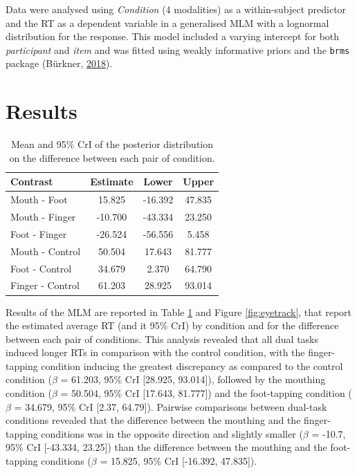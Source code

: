 \documentclass[a4paper,12pt,twoside,openright,oldfontcommands,final]{memoir}
\begin{document}
Data were analysed using \emph{Condition} (4 modalities) as a within-subject predictor and the RT as a dependent variable in a generalised MLM with a lognormal distribution for the response. This model included a varying intercept for both \emph{participant} and \emph{item} and was fitted using weakly informative priors and the \texttt{brms} package (Bürkner, \protect\hyperlink{ref-R-brms}{2018}).

\hypertarget{results-5}{%
\section{Results}\label{results-5}}

\begin{table}[H]
\begin{center}
\begin{threeparttable}
\caption{\label{tab:RTestimates}Mean and 95\% CrI of the posterior distribution on the difference between each pair of condition.}
\small{
\begin{tabular}{lccc}
\toprule
Contrast & \multicolumn{1}{c}{Estimate} & \multicolumn{1}{c}{Lower} & \multicolumn{1}{c}{Upper}\\
\midrule
Mouth - Foot & 15.825 & -16.392 & 47.835\\
Mouth - Finger & -10.700 & -43.334 & 23.250\\
Foot - Finger & -26.524 & -56.556 & 5.458\\
Mouth - Control & 50.504 & 17.643 & 81.777\\
Foot - Control & 34.679 & 2.370 & 64.790\\
Finger - Control & 61.203 & 28.925 & 93.014\\
\bottomrule
\end{tabular}
}
\end{threeparttable}
\end{center}
\end{table}

Results of the MLM are reported in Table \ref{tab:RTestimates} and Figure \ref{fig:eyetrack}, that report the estimated average RT (and it 95\% CrI) by condition and for the difference between each pair of conditions. This analysis revealed that all dual tasks induced longer RTs in comparison with the control condition, with the finger-tapping condition inducing the greatest discrepancy as compared to the control condition (\(\beta\) = 61.203, 95\% CrI {[}28.925, 93.014{]}), followed by the mouthing condition (\(\beta\) = 50.504, 95\% CrI {[}17.643, 81.777{]}) and the foot-tapping condition (\(\beta\) = 34.679, 95\% CrI {[}2.37, 64.79{]}). Pairwise comparisons between dual-task conditions revealed that the difference between the mouthing and the finger-tapping conditions was in the opposite direction and slightly smaller (\(\beta\) = -10.7, 95\% CrI {[}-43.334, 23.25{]}) than the difference between the mouthing and the foot-tapping conditions (\(\beta\) = 15.825, 95\% CrI {[}-16.392, 47.835{]}).
\end{document}

